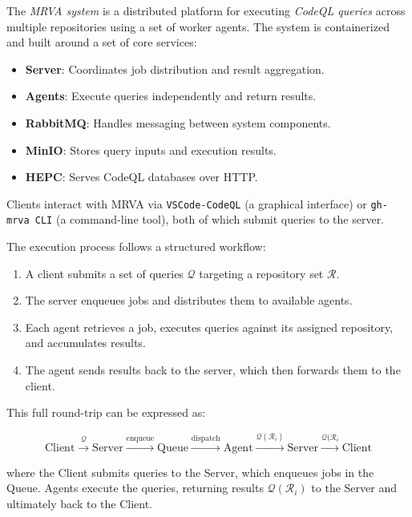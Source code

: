 \documentclass[11pt]{article}
\begin{document}
The \textit{MRVA system} is a distributed platform for executing \textit{CodeQL
  queries} across multiple repositories using a set of worker agents. The system is
{containerized} and built around a set of core services:

\begin{itemize}
\item \textbf{Server}: Coordinates job distribution and result aggregation.
\item \textbf{Agents}: Execute queries independently and return results.
\item \textbf{RabbitMQ}: Handles messaging between system components.
\item \textbf{MinIO}: Stores query inputs and execution results.
\item \textbf{HEPC}: Serves CodeQL databases over HTTP.
\end{itemize}

Clients interact with MRVA via \texttt{VSCode-CodeQL} (a graphical interface) or
\texttt{gh-mrva CLI} (a command-line tool), both of which submit queries to the
server.

The execution process follows a structured workflow:

\begin{enumerate}
\item A client submits a set of queries $\mathcal{Q}$ targeting a repository
  set $\mathcal{R}$.
\item The server enqueues jobs and distributes them to available agents.
\item Each agent retrieves a job, executes queries against its assigned repository, and accumulates results.
\item The agent sends results back to the server, which then forwards them to the client.
\end{enumerate}

This full round-trip can be expressed as:

\begin{equation}
  \text{Client} \xrightarrow{\mathcal{Q}} \text{Server}
  \xrightarrow{\text{enqueue}} 
  \text{Queue} \xrightarrow{\text{dispatch}} \text{Agent}
  \xrightarrow{\mathcal{Q}(\mathcal{R}_i)}
  \text{Server} \xrightarrow{\mathcal{Q}(\mathcal{R}_i} \text{Client}
\end{equation}

where the Client submits queries to the Server, which enqueues jobs in the
Queue. Agents execute the queries, returning results $\mathcal{Q}(\mathcal{R}_i)$
to the Server and ultimately back to the Client.
\end{document}
